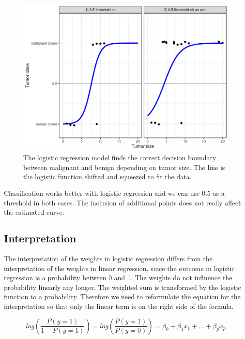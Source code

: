 \documentclass[12pt,]{krantz}
\begin{document}
\begin{figure}

{\centering \includegraphics[width=\textwidth]{images/logistic-class-threshold-1} 

}

\caption{The logistic regression model finds the correct decision boundary between malignant and benign depending on tumor size. The line is the logistic function shifted and squeezed to fit the data.}\label{fig:logistic-class-threshold}
\end{figure}

Classification works better with logistic regression and we can use 0.5
as a threshold in both cases. The inclusion of additional points does
not really affect the estimated curve.

\subsection{Interpretation}\label{interpretation-1}

The interpretation of the weights in logistic regression differs from
the interpretation of the weights in linear regression, since the
outcome in logistic regression is a probability between 0 and 1. The
weights do not influence the probability linearly any longer. The
weighted sum is transformed by the logistic function to a probability.
Therefore we need to reformulate the equation for the interpretation so
that only the linear term is on the right side of the formula.

\[log\left(\frac{P(y=1)}{1-P(y=1)}\right)=log\left(\frac{P(y=1)}{P(y=0)}\right)=\beta_{0}+\beta_{1}x_{1}+\ldots+\beta_{p}x_{p}\]
\end{document}
